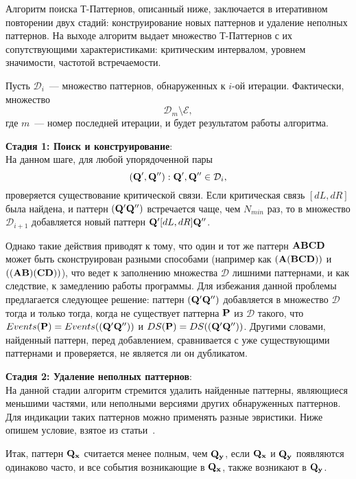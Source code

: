 Алгоритм поиска Т-Паттернов, описанный ниже, заключается в итеративном повторении двух стадий: конструирование новых паттернов и удаление
неполных паттернов. На выходе алгоритм выдает множество Т-Паттернов с их сопутствующими характеристиками: критическим интервалом, уровнем 
значимости, частотой встречаемости.

Пусть $\mathcal{D}_{i}$~--- множество паттернов, обнаруженных к $i$-ой итерации. Фактически, множество
$$\mathcal{D}_{m}\setminus\mathcal{E},$$ где $m$~--- номер последней итерации, и будет результатом работы алгоритма. 
\begin{trivlist}
 \item {\bf Стадия 1: Поиск и конструирование}:
\\
На данном шаге, для любой упорядоченной пары $$({\bf Q'},{\bf Q''}): {\bf Q'},{\bf Q''}\in\mathcal{D}_i,$$ проверяется существование критической
связи. Если критическая связь $[dL,dR]$ была найдена, и паттерн $({\bf Q'}{\bf Q''})$ встречается чаще, чем $N_{min}$ раз, 
 то в множество $\mathcal{D}_{i+1}$ добавляется новый паттерн
${\bf Q'}[dL,dR]{\bf Q''}$.

Однако такие действия приводят к тому, что один и тот же паттерн ${\bf ABCD}$ может быть сконструирован разными способами (например как
$({\bf A}({\bf BCD}))$ и $(({\bf AB})({\bf CD}))$), что ведет к заполнению множества $\mathcal{D}$ лишними паттернами, и как следствие, к 
замедлению работы программы. Для избежания данной проблемы предлагается следующее решение: паттерн $({\bf Q'Q''})$ добавляется в множество
$\mathcal{D}$ тогда и только тогда, когда не существует паттерна ${\bf P}$ из $\mathcal{D}$ такого, что $Events({\bf P})=Events(({\bf Q'Q''}))$
и $DS({\bf P})=DS(({\bf Q'Q''}))$. Другими словами, найденный паттерн, перед добавлением, сравнивается с уже существующими паттернами
и проверяется, не является ли он дубликатом.
\item {\bf Стадия 2: Удаление неполных паттернов}:
\\
На данной стадии алгоритм стремится удалить найденные паттерны, являющиеся меньшими частями, или неполными версиями других
обнаруженных паттернов. Для индикации таких паттернов можно применять разные эвристики. 
Ниже опишем условие, взятое из статьи~\cite{magnusson_orig}.

Итак, паттерн ${\bf Q_x}$ считается менее полным, чем ${\bf Q_y}$, если ${\bf Q_x}$ и ${\bf Q_y}$ появляются одинаково часто, и все события
возникающие в ${\bf Q_x}$, также возникают в ${\bf Q_y}$. 
\end{trivlist}
  
